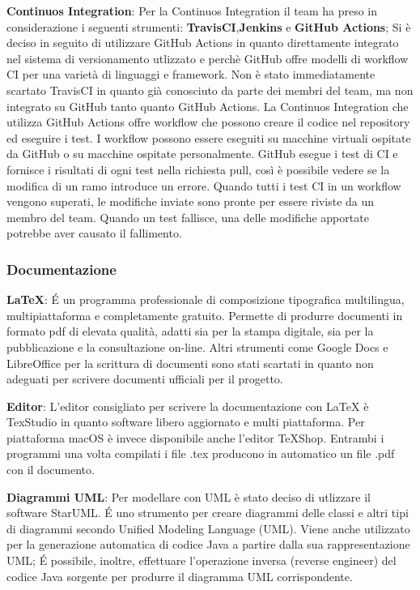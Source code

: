 \begin{description}
\item{\textbf{Continuos Integration}}:  Per la Continuos Integration il team ha preso in considerazione i seguenti strumenti: \textbf{TravisCI},\textbf{Jenkins} e \textbf{GitHub Actions};
Si è deciso in seguito di utilizzare GitHub Actions in quanto direttamente integrato nel sistema di versionamento utlizzato e perchè 
GitHub offre modelli di workflow CI per una varietà di linguaggi e framework.
Non è stato immediatamente scartato TravisCI in quanto già conosciuto da parte dei membri del team, ma non integrato su GitHub tanto quanto GitHub Actions.
La Continuos Integration che utilizza GitHub Actions offre workflow che possono creare il codice nel repository ed eseguire i test. 
I workflow possono essere eseguiti su macchine virtuali ospitate da GitHub o su macchine ospitate personalmente.
GitHub esegue i test di CI e fornisce i risultati di ogni test nella richiesta pull, così è possibile vedere se la modifica di un ramo introduce un errore. 
Quando tutti i test CI in un workflow vengono superati, le modifiche inviate sono pronte per essere riviste da un membro del team. 
Quando un test fallisce, una delle modifiche apportate potrebbe aver causato il fallimento. 

\end{description}

\subsubsection{Documentazione} 
\begin{description}
\item{\textbf{\LaTeX}}: \'E un programma professionale di composizione tipografica multilingua,
multipiattaforma e completamente gratuito. Permette di produrre documenti in formato pdf di elevata qualità, adatti sia per la stampa digitale, sia
per la pubblicazione e la consultazione on-line. 
Altri strumenti come Google Docs e LibreOffice per la scrittura di documenti sono stati scartati in quanto non adeguati per scrivere documenti ufficiali per il progetto.

\item{\textbf{Editor}}: L’editor  consigliato  per  scrivere  la  documentazione  con  {\LaTeX}  è TexStudio  in  quanto  software  libero  aggiornato  e  multi  piattaforma. Per piattaforma macOS è invece disponibile
anche l'editor TeXShop. Entrambi i programmi una volta compilati i file .tex producono in automatico un file .pdf con il documento.

\item{\textbf{Diagrammi UML}}: Per modellare con UML è stato deciso di utlizzare il software StarUML. \'E uno strumento per creare diagrammi delle classi e altri tipi di diagrammi secondo Unified Modeling Language (UML). 
Viene anche utilizzato per la generazione automatica di codice Java a partire dalla sua rappresentazione UML; \'E possibile, inoltre, effettuare l’operazione inversa (reverse engineer) del codice Java sorgente per produrre il diagramma UML corrispondente. 
\end{description}

